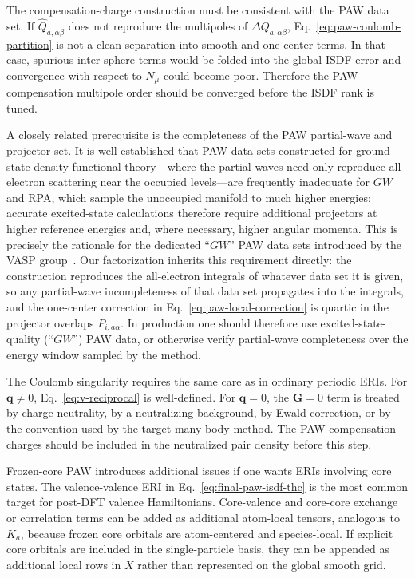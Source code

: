 \documentclass[aps,prb,reprint,superscriptaddress,longbibliography,nofootinbib]{revtex4-2}
\newcommand{\bG}{\mathbf G}
\newcommand{\bq}{\mathbf q}
\begin{document}
The compensation-charge construction must be consistent with the PAW data set.  If \(\widehat Q_{a,\alpha\beta}\) does not reproduce the multipoles of \(\Delta Q_{a,\alpha\beta}\), Eq.~\eqref{eq:paw-coulomb-partition} is not a clean separation into smooth and one-center terms.  In that case, spurious inter-sphere terms would be folded into the global ISDF error and convergence with respect to \(N_\mu\) could become poor.  Therefore the PAW compensation multipole order should be converged before the ISDF rank is tuned.

A closely related prerequisite is the completeness of the PAW partial-wave and projector set.  It is well established that PAW data sets constructed for ground-state density-functional theory---where the partial waves need only reproduce all-electron scattering near the occupied levels---are frequently inadequate for \(GW\) and RPA, which sample the unoccupied manifold to much higher energies; accurate excited-state calculations therefore require additional projectors at higher reference energies and, where necessary, higher angular momenta.  This is precisely the rationale for the dedicated ``\(GW\)'' PAW data sets introduced by the VASP group~\cite{ShishkinKresseGW,KlimesKaltakKresse}.  Our factorization inherits this requirement directly: the construction reproduces the all-electron integrals of whatever data set it is given, so any partial-wave incompleteness of that data set propagates into the integrals, and the one-center correction in Eq.~\eqref{eq:paw-local-correction} is quartic in the projector overlaps \(P_{i,a\alpha}\).  In production one should therefore use excited-state-quality (``\(GW\)'') PAW data, or otherwise verify partial-wave completeness over the energy window sampled by the method.

The Coulomb singularity requires the same care as in ordinary periodic ERIs.  For \(\bq\ne 0\), Eq.~\eqref{eq:v-reciprocal} is well-defined.  For \(\bq=0\), the \(\bG=0\) term is treated by charge neutrality, by a neutralizing background, by Ewald correction, or by the convention used by the target many-body method.  The PAW compensation charges should be included in the neutralized pair density before this step.

Frozen-core PAW introduces additional issues if one wants ERIs involving core states.  The valence-valence ERI in Eq.~\eqref{eq:final-paw-isdf-thc} is the most common target for post-DFT valence Hamiltonians.  Core-valence and core-core exchange or correlation terms can be added as additional atom-local tensors, analogous to \(K_a\), because frozen core orbitals are atom-centered and species-local.  If explicit core orbitals are included in the single-particle basis, they can be appended as additional local rows in \(X\) rather than represented on the global smooth grid.
\end{document}
